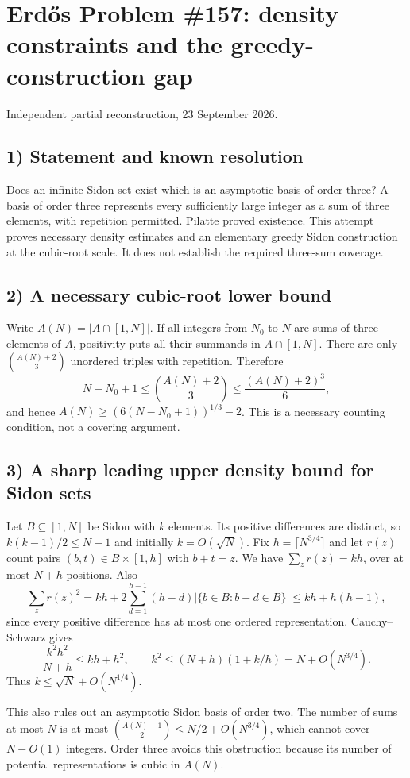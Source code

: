 \section{Erd\H{o}s Problem \#157: density constraints and the greedy-construction gap}
\noindent Independent partial reconstruction, 23 September 2026.

\subsection*{1) Statement and known resolution}
Does an infinite Sidon set exist which is an asymptotic basis of order three? A basis of order three represents every sufficiently large integer as a sum of three elements, with repetition permitted. Pilatte proved existence. This attempt proves necessary density estimates and an elementary greedy Sidon construction at the cubic-root scale. It does not establish the required three-sum coverage.

\subsection*{2) A necessary cubic-root lower bound}
Write $A(N)=|A\cap[1,N]|$. If all integers from $N_0$ to $N$ are sums of three elements of $A$, positivity puts all their summands in $A\cap[1,N]$. There are only $\binom{A(N)+2}{3}$ unordered triples with repetition. Therefore
\[
 N-N_0+1\le\binom{A(N)+2}{3}\le\frac{(A(N)+2)^3}{6},
\]
and hence $A(N)\ge(6(N-N_0+1))^{1/3}-2$. This is a necessary counting condition, not a covering argument.

\subsection*{3) A sharp leading upper density bound for Sidon sets}
Let $B\subseteq[1,N]$ be Sidon with $k$ elements. Its positive differences are distinct, so $k(k-1)/2\le N-1$ and initially $k=O(\sqrt N)$. Fix $h=\lceil N^{3/4}\rceil$ and let $r(z)$ count pairs $(b,t)\in B\times[1,h]$ with $b+t=z$. We have $\sum_zr(z)=kh$, over at most $N+h$ positions. Also
\[
 \sum_zr(z)^2
 =kh+2\sum_{d=1}^{h-1}(h-d)|\{b\in B:b+d\in B\}|
 \le kh+h(h-1),
\]
since every positive difference has at most one ordered representation. Cauchy--Schwarz gives
\[
 \frac{k^2h^2}{N+h}\le kh+h^2,
 \qquad k^2\le(N+h)(1+k/h)=N+O(N^{3/4}).
\]
Thus $k\le\sqrt N+O(N^{1/4})$.

This also rules out an asymptotic Sidon basis of order two. The number of sums at most $N$ is at most $\binom{A(N)+1}{2}\le N/2+O(N^{3/4})$, which cannot cover $N-O(1)$ integers. Order three avoids this obstruction because its number of potential representations is cubic in $A(N)$.

